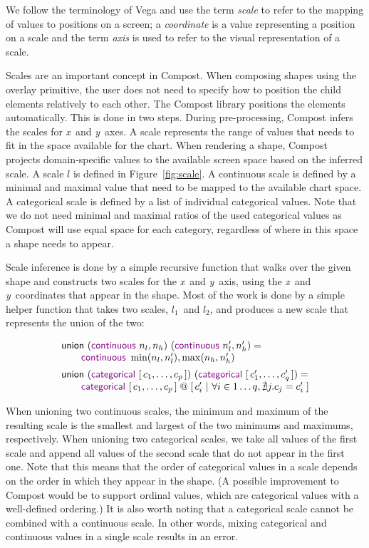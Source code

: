 \documentclass{jfp}
\newcommand{\X}{\emph{x}\ }
\newcommand{\Y}{\emph{y}\ }
\newcommand{\ident}[1]{\textnormal{\textcolor{idclr}{\sffamily #1}}}
\newcommand{\kvd}[1]{\textnormal{\textcolor{kvdclr}{\sffamily #1}}}
\begin{document}
We follow the terminology of Vega \cite{vega} and use the term \emph{scale} to refer to the mapping of
values to positions on a screen; a \emph{coordinate} is a value representing a position on a
scale and the term \emph{axis} is used to refer to the visual representation of a scale.

Scales are an important concept in Compost.
When composing shapes using the \kvd{overlay} primitive, the user does not need to specify how
to position the child elements relatively to each other. The Compost library positions the elements
automatically. This is done in two steps. During pre-processing, Compost infers the scales for
\X and \Y axes. A scale represents the range of values that needs to fit in the space available for
the chart. When rendering a shape, Compost projects domain-specific values to the available screen
space based on the inferred scale. A scale $l$ is defined in Figure~\ref{fig:scale}.
%
A continuous scale is defined by a minimal and maximal value that need to be mapped to the
available chart space. A categorical scale is defined by a list of individual categorical values.
Note that we do not need minimal and maximal ratios of the used categorical values as Compost
will use equal space for each category, regardless of where in this space a shape needs to
appear.

Scale inference is done by a simple recursive function that walks over the given shape and
constructs two scales for the \X and \Y axis, using the \X and \Y coordinates that appear in the shape.
Most of the work is done by a simple helper function that takes two scales, $l_1$~and $l_2$,
and produces a new scale that represents the union of the two:

\begin{equation*}
\begin{array}{l}
\ident{union}~(\kvd{continuous}~n_l, n_h)~(\kvd{continuous}~n'_l, n'_h) =\\
\qquad\kvd{continuous}~\min(n_l, n'_l), \max(n_h, n'_h)\\[0.5em]
\ident{union}~(\kvd{categorical}~[\,c_1, \ldots, c_p\,])~(\kvd{categorical}~[\,c'_1, \ldots, c'_q\,]) =\\
\qquad \kvd{categorical}~[\,c_1, \ldots, c_p\,] \;@\; [\,c'_i~|~ \forall i\in 1\ldots q, \nexists j. c_j = c'_i \;]
\end{array}
\end{equation*}

\vspace{-0.5em}
\noindent
When unioning two continuous scales, the minimum and maximum of the resulting scale is the smallest
and largest of the two minimums and maximums, respectively. When unioning two categorical scales,
we take all values of the first scale and append all values of the second scale that do not appear
in the first one. Note that this means that the order of categorical values in a scale depends on
the order in which they appear in the shape. (A possible improvement to Compost would be to support
ordinal values, which are categorical values with a well-defined ordering.) It is also worth noting
that a categorical scale cannot be combined with a continuous scale. In other words, mixing
categorical and continuous values in a single scale results in an error.
\end{document}
